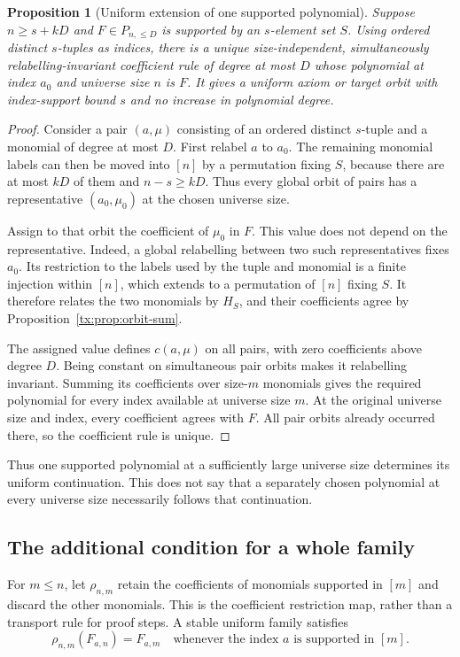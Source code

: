 \documentclass[11pt,a4paper,oneside,openany]{book}
\newtheorem{proposition}[theorem]{Proposition}
\theoremstyle{definition}\newtheorem{definition}[theorem]{Definition}
\theoremstyle{remark}\newtheorem{remark}[theorem]{Remark}
\numberwithin{equation}{chapter}
\begin{document}
\begin{proposition}[Uniform extension of one supported polynomial]\label{tx:prop:supported-extension}
Suppose $n\ge s+kD$ and $F\in P_{n,\le D}$ is supported by an
$s$-element set $S$. Using ordered distinct $s$-tuples as indices, there
is a unique size-independent, simultaneously relabelling-invariant
coefficient rule of degree at most $D$ whose polynomial at index
$a_0$ and universe size $n$ is $F$. It gives a uniform axiom or target orbit
with index-support bound $s$ and no increase in polynomial degree.
\end{proposition}
\begin{proof}
Consider a pair $(a,\mu)$ consisting of an ordered distinct $s$-tuple
and a monomial of degree at most $D$. First relabel $a$ to $a_0$.
The remaining monomial labels can then be moved into $[n]$ by a
permutation fixing $S$, because there are at most $kD$ of them and
$n-s\ge kD$. Thus every global orbit of pairs has a representative
$(a_0,\mu_0)$ at the chosen universe size.

Assign to that orbit the coefficient of $\mu_0$ in $F$. This value
does not depend on the representative. Indeed, a global relabelling
between two such representatives fixes $a_0$. Its restriction to the
labels used by the tuple and monomial is a finite injection within
$[n]$, which extends to a permutation of $[n]$ fixing $S$. It therefore
relates the two monomials by $H_S$, and their coefficients agree by
Proposition~\ref{tx:prop:orbit-sum}.

The assigned value defines $c(a,\mu)$ on all pairs, with zero
coefficients above degree $D$. Being constant on simultaneous pair
orbits makes it relabelling invariant. Summing its coefficients over
size-$m$ monomials gives the required polynomial for every index
available at universe size $m$. At the original universe size and index, every coefficient
agrees with $F$. All pair orbits already occurred there, so the
coefficient rule is unique.
\end{proof}

Thus one supported polynomial at a sufficiently large universe size determines
its uniform continuation. This does not say that a separately chosen
polynomial at every universe size necessarily follows that continuation.

\subsection{The additional condition for a whole family}
For $m\le n$, let $\rho_{n,m}$ retain the coefficients of monomials
supported in $[m]$ and discard the other monomials. This is the
coefficient restriction map, rather than a transport rule for proof
steps. A stable uniform family satisfies
\begin{equation}\label{tx:eq:coefficient-coherence}
        \rho_{n,m}(F_{a,n})=F_{a,m}
        \quad\text{whenever the index }a\text{ is supported in }[m].
\end{equation}
\end{document}

